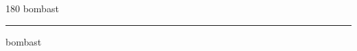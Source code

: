 
\begin{frame}
\begin{center}
\begin{turn}{180}
{\fontsize{2.5cm}{1em}\selectfont bombast}
\end{turn}
\vspace{1em}\par  
\hrule
\vspace{1em}\par  
{\fontsize{2.5cm}{1em}\selectfont bombast}
\end{center}
\end{frame}
